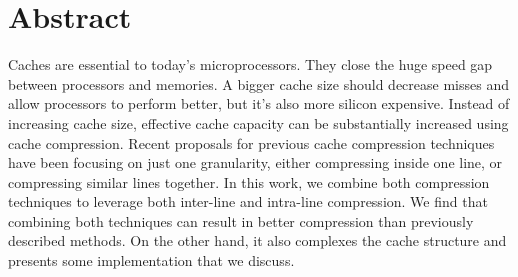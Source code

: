 
\chapter{Abstract}
Caches are essential to today's microprocessors. They close the huge speed gap between processors and memories. A bigger cache size should decrease misses and allow processors to perform better, but it's also more silicon expensive. Instead of increasing cache size, effective cache capacity can be substantially increased using cache compression. Recent proposals for previous cache compression techniques have been focusing on just one granularity, either compressing inside one line, or compressing similar lines together. In this work, we combine both compression techniques to leverage both inter-line and intra-line compression. We find that combining both techniques can result in better compression than previously described methods. On the other hand, it also complexes the cache structure and presents some implementation that we discuss.

